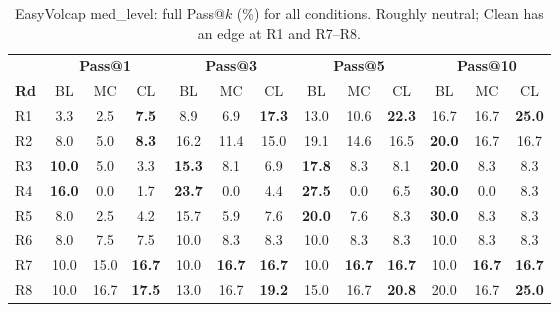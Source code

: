 \documentclass[11pt]{article}
\begin{document}
\begin{table}[t]
  \centering
  \small
  \begin{tabular}{l|ccc|ccc|ccc|ccc}
    \toprule
    & \multicolumn{3}{c|}{\textbf{Pass@1}} & \multicolumn{3}{c|}{\textbf{Pass@3}} & \multicolumn{3}{c|}{\textbf{Pass@5}} & \multicolumn{3}{c}{\textbf{Pass@10}} \\
    \textbf{Rd} & BL & MC & CL & BL & MC & CL & BL & MC & CL & BL & MC & CL \\
    \midrule
    R1 & 3.3 & 2.5 & \textbf{7.5}  & 8.9 & 6.9 & \textbf{17.3}  & 13.0 & 10.6 & \textbf{22.3}  & 16.7 & 16.7 & \textbf{25.0} \\
    R2 & 8.0 & 5.0 & \textbf{8.3}  & 16.2 & 11.4 & 15.0  & 19.1 & 14.6 & 16.5  & \textbf{20.0} & 16.7 & 16.7 \\
    R3 & \textbf{10.0} & 5.0 & 3.3  & \textbf{15.3} & 8.1 & 6.9  & \textbf{17.8} & 8.3 & 8.1  & \textbf{20.0} & 8.3 & 8.3 \\
    R4 & \textbf{16.0} & 0.0 & 1.7  & \textbf{23.7} & 0.0 & 4.4  & \textbf{27.5} & 0.0 & 6.5  & \textbf{30.0} & 0.0 & 8.3 \\
    R5 & 8.0 & 2.5 & 4.2  & 15.7 & 5.9 & 7.6  & \textbf{20.0} & 7.6 & 8.3  & \textbf{30.0} & 8.3 & 8.3 \\
    R6 & 8.0 & 7.5 & 7.5  & 10.0 & 8.3 & 8.3  & 10.0 & 8.3 & 8.3  & 10.0 & 8.3 & 8.3 \\
    R7 & 10.0 & 15.0 & \textbf{16.7} & 10.0 & \textbf{16.7} & \textbf{16.7} & 10.0 & \textbf{16.7} & \textbf{16.7} & 10.0 & \textbf{16.7} & \textbf{16.7} \\
    R8 & 10.0 & 16.7 & \textbf{17.5} & 13.0 & 16.7 & \textbf{19.2} & 15.0 & 16.7 & \textbf{20.8} & 20.0 & 16.7 & \textbf{25.0} \\
    \bottomrule
  \end{tabular}
  \caption{EasyVolcap med\_level: full Pass@$k$ (\%) for all conditions. Roughly neutral; Clean has an edge at R1 and R7--R8.}
  \label{tab:app-ev-med}
\end{table}
\end{document}
